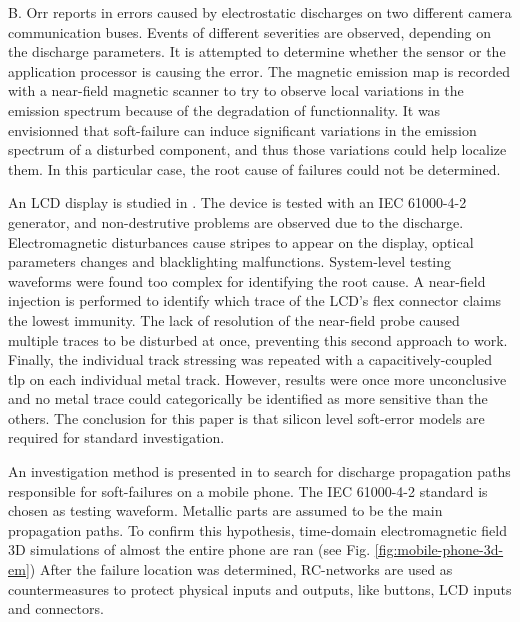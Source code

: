 B. Orr reports in \cite{softFailSubsystem} errors caused by electrostatic discharges on two different camera communication buses.
Events of different severities are observed, depending on the discharge parameters.
It is attempted to determine whether the sensor or the application processor is causing the error.
The magnetic emission map is recorded with a near-field magnetic scanner to try to observe local variations in the emission spectrum because of the degradation of functionnality.
It was envisionned that soft-failure can induce significant variations in the emission spectrum of a disturbed component, and thus those variations could help localize them.
In this particular case, the root cause of failures could not be determined.

An LCD display is studied in \cite{softFailLCD}.
The device is tested with an IEC 61000-4-2 \cite{iec61000-4-2} generator, and non-destrutive problems are observed due to the discharge.
Electromagnetic disturbances cause stripes to appear on the display, optical parameters changes and blacklighting malfunctions.
System-level testing waveforms were found too complex for identifying the root cause.
A near-field injection is performed to identify which trace of the LCD's flex connector claims the lowest immunity.
The lack of resolution of the near-field probe caused multiple traces to be disturbed at once, preventing this second approach to work.
Finally, the individual track stressing was repeated with a capacitively-coupled \gls{tlp} on each individual metal track.
However, results were once more unconclusive and no metal trace could categorically be identified as more sensitive than the others.
The conclusion for this paper is that silicon level soft-error models are required for standard investigation.

An investigation method is presented in \cite{softFailMobile} to search for discharge propagation paths responsible for soft-failures on a mobile phone.
The IEC 61000-4-2 standard is chosen as testing waveform.
Metallic parts are assumed to be the main propagation paths.
To confirm this hypothesis, time-domain electromagnetic field 3D simulations of almost the entire phone are ran (see Fig. \ref{fig:mobile-phone-3d-em})
After the failure location was determined, RC-networks are used as countermeasures to protect physical inputs and outputs, like buttons, LCD inputs and connectors.

